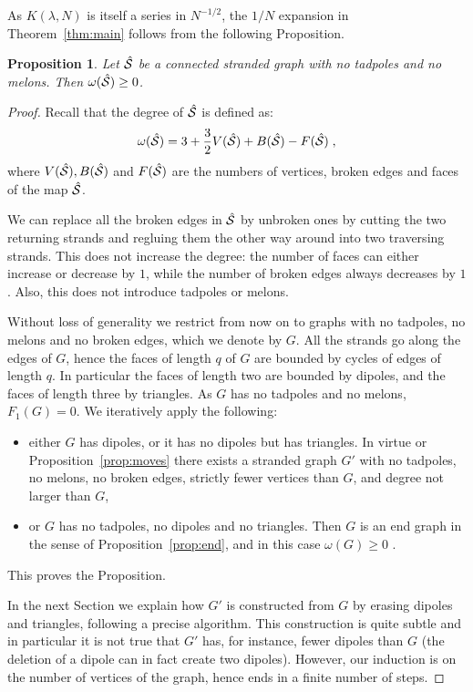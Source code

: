 \documentclass[10pt]{article}
\theoremstyle{plain}
\newtheorem{proposition}{Proposition}
\theoremstyle{definition}
\newcommand{\cS}{{\cal S}}
\begin{document}
As $K(\lambda, N) $ is itself a series in $N^{-1/2}$, the $1/N$ expansion in Theorem~\ref{thm:main} follows from the following Proposition.
\begin{proposition}\label{prop:main}
 Let $\hat \cS $ be a connected stranded graph with no tadpoles and no melons. Then $\omega(\hat \cS) \ge 0$.
\end{proposition}
\begin{proof}
 Recall that the degree of $\hat \cS$ is defined as:
\[
\omega(\hat \cS) = 3 +  \frac{3}{2} V(\hat \cS)  + B(\hat \cS) - F(\hat \cS)  \;,
\]
where $V(\hat \cS), B(\hat \cS)$ and $F(\hat \cS)$ are the numbers of vertices, broken edges and faces of the map $\hat \cS$. 

We can replace all the broken edges in $\hat \cS$ by unbroken ones by cutting the two returning strands  
and regluing them the other way around into two traversing strands. This does not increase the degree: the number of faces can either increase or decrease by $1$, while the number of broken edges always 
decreases by $1$. Also, this does not introduce tadpoles or melons. 

Without loss of generality we restrict from now on to graphs with no tadpoles, no melons and  no broken edges, which we denote by $G$. 
All the strands go along the edges of $G$, hence the faces of length $q$ of $G$ are bounded by cycles of edges of length $q$. In particular the faces of length two are bounded by dipoles, and the faces of length three
by triangles. As $G$ has no tadpoles and no melons, $F_1(G)=0$. We iteratively apply the following:
\begin{itemize}
  \item either $G$ has dipoles, or it has no dipoles but has triangles. In virtue or Proposition~\ref{prop:moves} there exists a stranded graph $G'$ with no tadpoles, no melons, no broken edges,
        strictly fewer vertices than $G$, and degree not larger 
        than $G$,
 \item  or $G$ has no tadpoles, no dipoles and no triangles. Then $G$ is an end graph in the sense of Proposition~\ref{prop:end}, and in this case $\omega(G)\ge 0$ .
 \end{itemize}
 This proves the Proposition.
 
 In the next Section we explain how $G'$ is constructed from $G$ by erasing dipoles and triangles, following a precise algorithm. This construction is quite subtle and 
 in particular it is not true that $G'$ has, for instance, fewer dipoles than $G$ (the deletion of a dipole can in fact create two dipoles). However, our induction is 
 on the number of vertices of the graph, hence ends in a finite number of steps.
 \end{proof}
\end{document}
